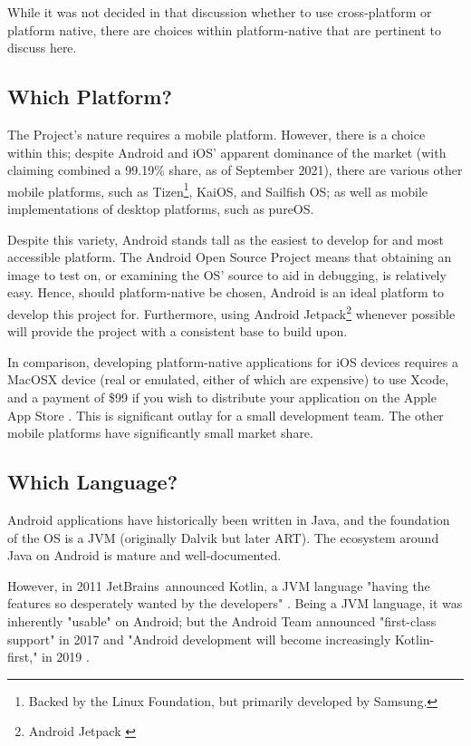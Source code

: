 \documentclass[11pt, a4paper, notitlepage]{report}
\begin{document}
While it was not decided in that discussion whether to use cross-platform or platform native, there are choices within platform-native that are pertinent to discuss here.

\subsection{Which Platform?}
The Project's nature requires a mobile platform. However, there is a choice 
within this; despite Android and iOS' apparent dominance of the market (with 
\citet{MobileMarketShare} claiming combined a 99.19\% share, as of September 2021), there are various other mobile platforms, such as Tizen\footnote{Backed by the Linux Foundation, but primarily developed by Samsung.}, KaiOS, and Sailfish OS; as well as mobile implementations of desktop platforms, such as pureOS.

Despite this variety, Android stands tall as the easiest to develop for and 
most accessible platform. The Android Open Source Project means that obtaining 
an image to test on, or examining the OS' source to aid in debugging, is 
relatively easy. Hence, should platform-native be chosen, Android is an ideal platform to develop this project for. Furthermore, using Android Jetpack\footnote{Android Jetpack \citep{AndroidJetpack}} whenever possible will provide the project with a consistent base to build upon.

In comparison, developing platform-native applications for iOS devices requires 
a MacOSX device (real or emulated, either of which are expensive) to use Xcode, and a payment of \$99 if you wish to distribute your application on the Apple App Store \citep{AppleDevProgram}. This is significant outlay for a small development team. The other mobile platforms have significantly small market share.

\subsection{Which Language?}
Android applications have historically been written in Java, and the foundation 
of the OS is a JVM (originally Dalvik but later ART). The ecosystem around Java 
on Android is mature and well-documented.

However, in 2011 JetBrains\texttrademark\ announced Kotlin, a JVM language 
"having the features so desperately wanted by the developers" \citep{KotlinAnnounced}. Being a JVM language, it was inherently "usable" on Android; but the Android Team announced "first-class support" in 2017 \citep{KotlinPreferred} and "Android development will become increasingly Kotlin-first," in 2019 \citep{KotlinFirst}.
\end{document}
